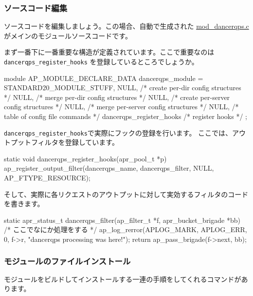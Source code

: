 \documentclass[mingoth,a4paper]{jsarticle}
\begin{document}
\subsubsection{ソースコード編集}

ソースコードを編集しましょう。この場合、自動で生成された
\url{mod_dancerqps.c}がメインのモジュールソースコードです。

まず一番下に一番重要な構造が定義されています。ここで重要なのは
\verb!dancerqps_register_hooks! を登録しているところでしょうか。

\begin{commandline}
module AP_MODULE_DECLARE_DATA dancerqps_module = {
    STANDARD20_MODULE_STUFF,
    NULL,                  /* create per-dir    config structures */
    NULL,                  /* merge  per-dir    config structures */
    NULL,                  /* create per-server config structures */
    NULL,                  /* merge  per-server config structures */
    NULL,                  /* table of config file commands       */
    dancerqps_register_hooks  /* register hooks                      */
};
\end{commandline}


\verb!dancerqps_register_hooks!で実際にフックの登録を行います。
ここでは、アウトプットフィルタを登録しています。
\begin{commandline}
static void dancerqps_register_hooks(apr_pool_t *p) {
  ap_register_output_filter(dancerqps_name, dancerqps_filter,
			    NULL, AP_FTYPE_RESOURCE);
}
\end{commandline}

そして、実際に各リクエストのアウトプットに対して実効するフィルタのコード
を書きます。

\begin{commandline}
static apr_status_t dancerqps_filter(ap_filter_t *f, apr_bucket_brigade *bb) {
  /* ここでなにか処理をする */
  ap_log_rerror(APLOG_MARK, APLOG_ERR, 0, f->r,
		"dancerqps processing was here!");
  return ap_pass_brigade(f->next, bb);
}
\end{commandline}

\subsubsection{モジュールのファイルインストール}

モジュールをビルドしてインストールする一連の手順をしてくれるコマンドがあ
ります。

\end{document}
